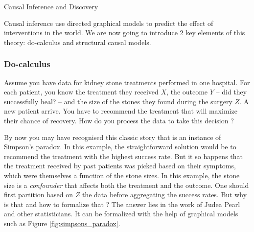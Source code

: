 {Causal Inference and Discovery}

Causal inference use directed graphical models to predict the effect of interventions in the world. We are now going to introduce 2 key elements of this theory: do-calculus and structural causal models.

\subsubsection{Do-calculus}
Assume you have data for kidney stone treatments performed in one hospital. For each patient, you know the treatment they received $X$, the outcome $Y$ -- did they successfully heal? -- and the size of the stones they found during the surgery $Z$. A new patient arrive. You have to recommend the treatment that will maximize their chance of recovery.  How do you process the data to take this decision ?

By now you may have recognised this classic story that is an instance of Simpson's paradox. In this example, the straightforward solution would be to recommend the treatment with the highest success rate. But it so happens that the treatment received by past patients was picked based on their symptoms, which were themselves a function of the stone sizes. In this example, the stone size is a \textit{confounder} that affects both the treatment and the outcome. One should first partition based on $Z$ the data before aggregating the success rates. But why is that and how to formalize that ? The answer lies in the work of Judea Pearl \citep{pearl2009causality} and other statisticians. It can be formalized with the help of graphical models such as Figure \ref{fig:simpsons_paradox}.


%    

